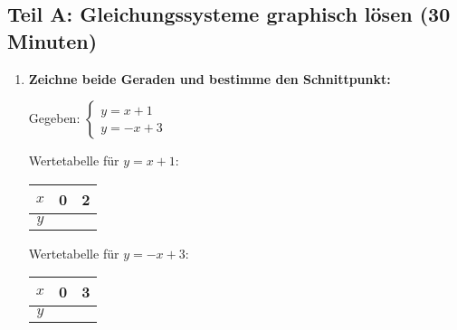 \subsection*{Teil A: Gleichungssysteme graphisch lösen (30 Minuten)}

\begin{enumerate}[label=\arabic*.]

    \item \textbf{Zeichne beide Geraden und bestimme den Schnittpunkt:}
    \vspace{0.5cm}

    Gegeben: $\begin{cases} y = x + 1 \\ y = -x + 3 \end{cases}$

    \begin{center}
    \end{center}

    \vspace{0.5cm}
    Wertetabelle für $y = x + 1$:
    \begin{center}
        \begin{tabular}{|c|c|c|}
            \hline
            $x$ & 0 & 2 \\
            \hline
            $y$ & \phantom{1} & \phantom{3} \\
            \hline
        \end{tabular}
    \end{center}

    Wertetabelle für $y = -x + 3$:
    \begin{center}
        \begin{tabular}{|c|c|c|}
            \hline
            $x$ & 0 & 3 \\
            \hline
            $y$ & \phantom{3} & \phantom{0} \\
            \hline
        \end{tabular}
    \end{center}


\end{enumerate}
